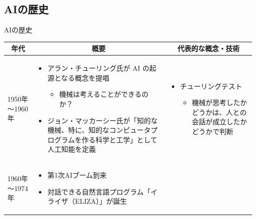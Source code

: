 \documentclass[dvipdfmx,aspectratio=169]{beamer}
\begin{document}
	\subsection{AIの歴史}
	\begin{frame}[shrink]{AIの歴史}
		\begin{table}[h]
			\centering
			\begin{tabular}{lp{35em}p{40em}}
				\toprule
				\multicolumn{1}{c}{年代} & \multicolumn{1}{c}{概要}                                                                                                                        & \multicolumn{1}{c}{代表的な概念・技術}                                                                                                                                                    \\
				\midrule
				1950年～1960年            & \begin{minipage}{35em}
												\begin{itemize}
													\item アラン・チューリング氏が AI の起源となる概念を提唱
													\begin{itemize}
														\item 機械は考えることができるのか？
													\end{itemize}
													\item ジョン・マッカーシー氏が「知的な機械、特に、知的なコンピュータプログラムを作る科学と工学」として人工知能を定義
												\end{itemize}
											\end{minipage} & \begin{minipage}{40em}
												\begin{itemize}
													\item \alert{チューリングテスト}
													\begin{itemize}
														\item 機械が思考したかどうかは、人との会話が成立したかどうかで判断
													\end{itemize}
												\end{itemize}
											\end{minipage} \\
				\midrule
				1960年～1974年            & \begin{minipage}{35em}
												\begin{itemize}
													\item 第1次AIブーム到来
													\item 対話できる自然言語プログラム「\alert{イライザ}（ELIZA）」が誕生

\end{itemize}
\end{minipage}
\end{tabular}
\end{table}
\end{frame}
\end{document}
